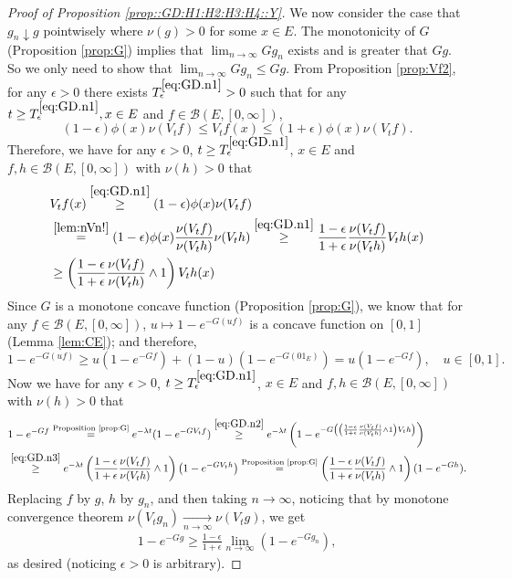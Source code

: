 \documentclass[12pt,a4paper]{amsart}
\numberwithin{equation}{section}
\theoremstyle{plain}
\theoremstyle{definition}
\theoremstyle{remark}
\begin{document}
\begin{proof}[Proof of Proposition \ref{prop::GD:H1:H2:H3:H4::Y}]
	We now consider the case that $g_n \downarrow g$ pointwisely where $\nu(g) > 0$ for some $x\in E$.
	The monotonicity of $G$ (Proposition \ref{prop:G}) implies that $\lim_{n \to \infty} Gg_n$ exists and is greater that $G g$.
	So we only need to show that $\lim_{n\to \infty} Gg_n \leq Gg$.
	From Proposition \ref{prop:Vf2}, for any $\epsilon>0$ there exists $T_\epsilon^{\eqref{eq:GD.n1}} >0$ such that for any $t\geq T_\epsilon^{\eqref{eq:GD.n1}}, x\in E$ and $f\in \mathcal B(E,[0,\infty])$,
\begin{equation} \label{eq:GD.n1}
	(1-\epsilon)\phi(x) \nu(V_tf)\leq V_tf(x)
	\leq (1+\epsilon)\phi(x) \nu(V_tf).
\end{equation}
	Therefore, we have for any $\epsilon>0$, $t \geq T_\epsilon^{\eqref{eq:GD.n1}}$, $x\in E$ and $f, h\in \mathcal B(E,[0,\infty])$ with $\nu(h) >0$ that
\begin{align}
	&V_tf(x)
	\overset{\eqref{eq:GD.n1}}\geq (1-\epsilon)\phi(x) \nu(V_tf)
	\\& \overset{\eqref{lem:nVn!}}= (1-\epsilon)\phi(x) \frac{\nu(V_tf)}{\nu(V_th)} \nu(V_th)
\overset{\eqref{eq:GD.n1}}\geq \frac{1-\epsilon}{1+\epsilon} \frac{\nu(V_tf)}{\nu(V_th)} V_th(x)
	\\ \label{eq:GD.n2} & \geq \left(\frac{1-\epsilon}{1+\epsilon} \frac{\nu(V_tf)}{\nu(V_th)} \wedge 1\right) V_th(x)
\end{align}
	Since $G$ is a monotone concave function (Proposition \ref{prop:G}), we know that for any $f\in \mathcal B(E,[0,\infty])$, $u \mapsto 1 - e^{-G(uf)}$ is a concave function on $[0,1]$ (Lemma \ref{lem:CE}); and therefore,
\begin{equation} \label{eq:GD.n3}
	1 - e^{- G(uf)}\geq u(1- e^{- Gf}) + (1-u) (1- e^{- G(0  1_E)}) = u(1- e^{- Gf}), \quad u \in [0,1].
\end{equation}
	Now we have for any $\epsilon>0$, $t \geq T_\epsilon^{\eqref{eq:GD.n1}}$, $x\in E$ and $f, h\in \mathcal B(E,[0,\infty])$ with $\nu(h) >0$ that
\begin{align}
	&1 - e^{-Gf}
	\overset{\text{Proposition \ref{prop:G}}}= e^{-\lambda t}(1- e^{- GV_t f})
	\overset{\eqref{eq:GD.n2}}\geq e^{-\lambda t}\left(1- e^{- G\left( \left(\frac{1-\epsilon}{1+\epsilon} \frac{\nu(V_tf)}{\nu(V_th)} \wedge 1\right) V_th\right) }\right)
	\\ &\overset{\eqref{eq:GD.n3}}\geq e^{-\lambda t} \left(\frac{1-\epsilon}{1+\epsilon} \frac{\nu(V_tf)}{\nu(V_th)} \wedge 1 \right) \left(1- e^{- GV_th }\right)
	\overset{\text{Proposition \ref{prop:G}}}= \left(\frac{1-\epsilon}{1+\epsilon} \frac{\nu(V_tf)}{\nu(V_th)} \wedge 1\right) (1 - e^{- Gh}).
\end{align}
	Replacing $f$ by $g$, $h$ by $g_n$, and then taking $n\to \infty$, noticing that by monotone convergence theorem $\nu(V_tg_n) \xrightarrow[n\to \infty]{} \nu(V_tg)$, we get
\begin{align}
	1 - e^{- Gg} \geq \frac{1 - \epsilon}{1+\epsilon}\lim_{n\to \infty}(1 - e^{- Gg_n}),
\end{align}
	as desired (noticing $\epsilon > 0$ is arbitrary).
\end{proof}
\end{document}
